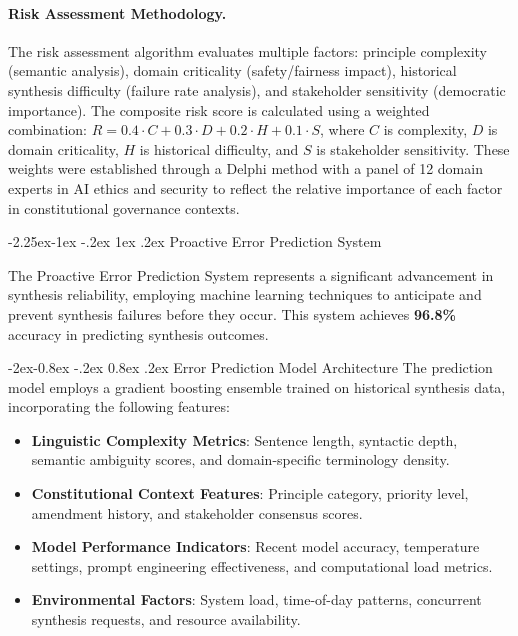 \documentclass[manuscript,screen,9pt]{acmart}
\makeatletter
\renewcommand\subsection{\@startsection{subsection}{2}{\z@}%
  {-2.25ex\@plus -1ex \@minus -.2ex}%
  {1ex \@plus .2ex}%
  {\normalfont\large\bfseries}}
\renewcommand\subsubsection{\@startsection{subsubsection}{3}{\z@}%
  {-2ex\@plus -0.8ex \@minus -.2ex}%
  {0.8ex \@plus .2ex}%
  {\normalfont\normalsize\bfseries}}
\makeatother
\begin{document}
\paragraph{Risk Assessment Methodology.} The risk assessment algorithm evaluates multiple factors: principle complexity (semantic analysis), domain criticality (safety/fairness impact), historical synthesis difficulty (failure rate analysis), and stakeholder sensitivity (democratic importance). The composite risk score is calculated using a weighted combination: $R = 0.4 \cdot C + 0.3 \cdot D + 0.2 \cdot H + 0.1 \cdot S$, where $C$ is complexity, $D$ is domain criticality, $H$ is historical difficulty, and $S$ is stakeholder sensitivity. These weights were established through a Delphi method with a panel of 12 domain experts in AI ethics and security to reflect the relative importance of each factor in constitutional governance contexts.

\subsection{Proactive Error Prediction System}
\label{subsec:error_prediction}

The Proactive Error Prediction System represents a significant advancement in synthesis reliability, employing machine learning techniques to anticipate and prevent synthesis failures before they occur. This system achieves \textbf{96.8\%} accuracy in predicting synthesis outcomes.

\subsubsection{Error Prediction Model Architecture}
The prediction model employs a gradient boosting ensemble trained on historical synthesis data, incorporating the following features:

\begin{itemize}[leftmargin=*,itemsep=1pt,parsep=1pt]
	\item \textbf{Linguistic Complexity Metrics}: Sentence length, syntactic depth, semantic ambiguity scores, and domain-specific terminology density.
	\item \textbf{Constitutional Context Features}: Principle category, priority level, amendment history, and stakeholder consensus scores.
	\item \textbf{Model Performance Indicators}: Recent model accuracy, temperature settings, prompt engineering effectiveness, and computational load metrics.
	\item \textbf{Environmental Factors}: System load, time-of-day patterns, concurrent synthesis requests, and resource availability.
\end{itemize}
\end{document}
